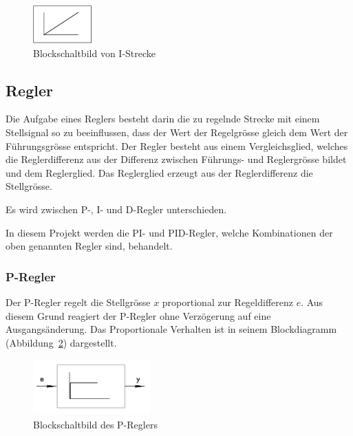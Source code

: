 \begin{figure}[h!, width=\pagewidth]
    \centering
    \includegraphics[width=0.2\textwidth]{images/IStrecke}
    \caption{Blockschaltbild von I-Strecke}
    \label{fig:IStrecke}
\end{figure}


\subsection{Regler}

Die Aufgabe  eines Reglers  besteht darin  die zu  regelnde Strecke  mit einem
Stellsignal  so  zu  beeinflussen,  dass der  Wert  der  Regelgr\"osse  gleich
dem  Wert  der F\"uhrungsgr\"osse  entspricht. Der  Regler  besteht aus  einem
Vergleichsglied,  welches  die  Reglerdifferenz  aus  der  Differenz  zwischen
F\"uhrungs-  und Reglergr\"osse  bildet und  dem Reglerglied. Das  Reglerglied
erzeugt aus der Reglerdifferenz die Stellgr\"osse.

Es wird zwischen P-, I- und D-Regler unterschieden.

In diesem Projekt werden die PI- und PID-Regler, welche Kombinationen der oben
genannten Regler sind, behandelt.

\subsubsection*{P-Regler}
Der  P-Regler regelt  die  Stellgr\"osse $x$  proportional zur  Regeldifferenz
$e$. Aus  diesem  Grund reagiert  der  P-Regler  ohne Verz\"ogerung  auf  eine
Ausgangs\"anderung. Das  Proportionale Verhalten  ist in  seinem Blockdiagramm
(Abbildung~\ref{fig:PRegler}) dargestellt.

\begin{figure}[h!, width=\pagewidth]
    \centering
    \includegraphics[width=0.4\textwidth]{images/PRegler}
    \caption{Blockschaltbild des P-Reglers}
    \label{fig:PRegler}
\end{figure}

